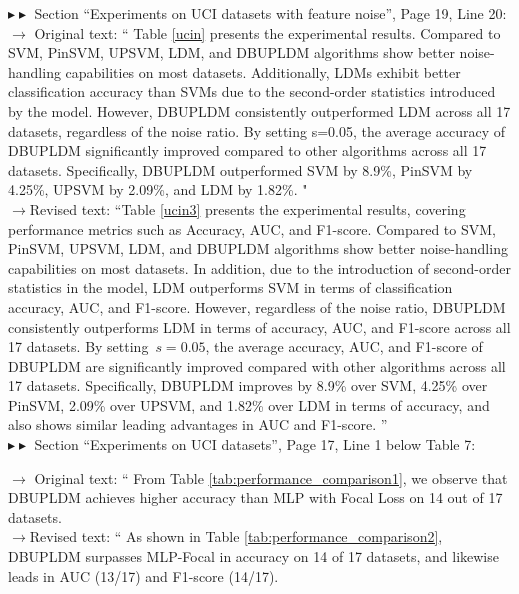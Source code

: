 \documentclass[journal,12pn, onecolumn]{IEEEtran}
\begin{document}
{{{{{$\blacktriangleright\blacktriangleright$ Section ``Experiments on UCI datasets with feature noise'', Page 19, Line 20:\\


{\color{black} $\longrightarrow$  Original  text: `` Table \ref{ucin} presents the experimental results. Compared to SVM, PinSVM, UPSVM, LDM, and DBUPLDM algorithms show better noise-handling capabilities on most datasets. Additionally, LDMs exhibit better classification accuracy than SVMs due to the second-order statistics introduced by the model. However, DBUPLDM consistently outperformed LDM across all 17 datasets, regardless of the noise ratio. By setting s=0.05, the average accuracy of DBUPLDM significantly improved compared to other algorithms across all 17 datasets. Specifically, DBUPLDM outperformed SVM by 8.9\%, PinSVM by 4.25\%, UPSVM by 2.09\%, and LDM by 1.82\%.
"}\\


{\color{orange}$\longrightarrow$Revised text: ``Table \ref{ucin3} presents the experimental results, covering performance metrics such as Accuracy, AUC, and F1-score. } Compared to SVM, PinSVM, UPSVM, LDM, and DBUPLDM algorithms show better noise-handling capabilities on most datasets. {\color{orange}In addition, due to the introduction of second-order statistics in the model, LDM outperforms SVM in terms of classification accuracy, AUC, and F1-score. However, regardless of the noise ratio, DBUPLDM consistently outperforms LDM in terms of accuracy, AUC, and F1-score across all 17 datasets. By setting \(s = 0.05\), the average accuracy, AUC, and F1-score of DBUPLDM are significantly improved compared with other algorithms across all 17 datasets. Specifically, DBUPLDM improves by 8.9\% over SVM, 4.25\% over PinSVM, 2.09\% over UPSVM, and 1.82\% over LDM in terms of accuracy, and also shows similar leading advantages in AUC and F1-score. 
''}\\


$\blacktriangleright\blacktriangleright$ Section ``Experiments on UCI datasets'', Page 17,  Line 1 below Table 7:\\
\par

{\color{black} $\longrightarrow$  Original  text: `` From Table \ref{tab:performance_comparison1}, we observe that DBUPLDM achieves higher accuracy than MLP with Focal Loss on 14 out of 17
datasets.\\

{\color{orange}$\longrightarrow$Revised text: `` As shown in Table \ref{tab:performance_comparison2}, DBUPLDM surpasses MLP-Focal in accuracy on 14 of 17 datasets, and likewise leads in AUC (13/17) and F1-score (14/17).}\\ 




}}}}}}
\end{document}

